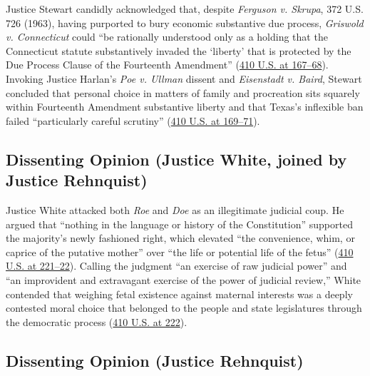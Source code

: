 \documentclass[12pt]{article}
\begin{document}
Justice Stewart candidly acknowledged that, despite \textit{Ferguson v. Skrupa}, 372 U.S. 726 (1963), having purported to bury economic substantive due process, \textit{Griswold v. Connecticut} could ``be rationally understood only as a holding that the Connecticut statute substantively invaded the `liberty' that is protected by the Due Process Clause of the Fourteenth Amendment'' (\href{https://supreme.justia.com/cases/federal/us/410/113/}{410 U.S. at 167--68}). Invoking Justice Harlan's \textit{Poe v. Ullman} dissent and \textit{Eisenstadt v. Baird}, Stewart concluded that personal choice in matters of family and procreation sits squarely within Fourteenth Amendment substantive liberty and that Texas's inflexible ban failed ``particularly careful scrutiny'' (\href{https://supreme.justia.com/cases/federal/us/410/113/}{410 U.S. at 169--71}).

\subsection{Dissenting Opinion (Justice White, joined by Justice Rehnquist)}

Justice White attacked both \textit{Roe} and \textit{Doe} as an illegitimate judicial coup. He argued that ``nothing in the language or history of the Constitution'' supported the majority's newly fashioned right, which elevated ``the convenience, whim, or caprice of the putative mother'' over ``the life or potential life of the fetus'' (\href{https://supreme.justia.com/cases/federal/us/410/179/}{410 U.S. at 221--22}). Calling the judgment ``an exercise of raw judicial power'' and ``an improvident and extravagant exercise of the power of judicial review,'' White contended that weighing fetal existence against maternal interests was a deeply contested moral choice that belonged to the people and state legislatures through the democratic process (\href{https://supreme.justia.com/cases/federal/us/410/179/}{410 U.S. at 222}).

\subsection{Dissenting Opinion (Justice Rehnquist)}
\end{document}
